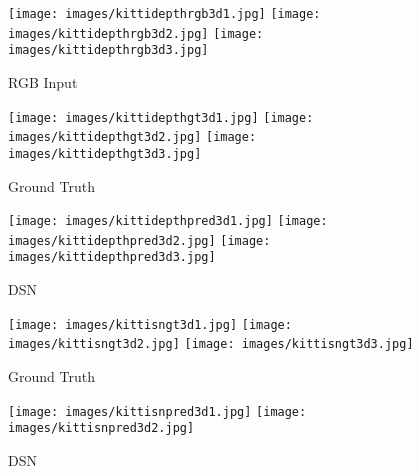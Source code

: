 \documentclass[5p]{elsarticle}
\begin{document}
\begin{figure*}[t!]
\centering
     \begin{subfigure}[t]{0.19\textwidth}
         \centering
         \caption{RGB Input}
         \texttt{[image: images/kittidepthrgb3d1.jpg]}
         \hspace{1em}
         \texttt{[image: images/kittidepthrgb3d2.jpg]}
         \hspace{1em}
         \texttt{[image: images/kittidepthrgb3d3.jpg]}
         \label{kittisubfig3d:0}
     \end{subfigure}
     \begin{subfigure}[t]{0.19\textwidth}
         \centering
         \caption{Ground Truth}
         \texttt{[image: images/kittidepthgt3d1.jpg]}
         \hspace{1em}
         \texttt{[image: images/kittidepthgt3d2.jpg]}
         \hspace{1em}
         \texttt{[image: images/kittidepthgt3d3.jpg]}
         \label{kittisubfig3d:1}
     \end{subfigure}
         \begin{subfigure}[t]{0.19\textwidth}
         \centering
         \caption{DSN}
         \texttt{[image: images/kittidepthpred3d1.jpg]}
         \hspace{1em}
         \texttt{[image: images/kittidepthpred3d2.jpg]}
         \hspace{1em}
         \texttt{[image: images/kittidepthpred3d3.jpg]}
         \label{kittisubfig3d:2}
     \end{subfigure}
     \begin{subfigure}[t]{0.19\textwidth}
         \centering
         \caption{Ground Truth}
         \texttt{[image: images/kittisngt3d1.jpg]}
         \hspace{1em}
         \texttt{[image: images/kittisngt3d2.jpg]}
         \hspace{1em}
         \texttt{[image: images/kittisngt3d3.jpg]}
         \label{kittisubfig3d:3}
     \end{subfigure}
          \begin{subfigure}[t]{0.19\textwidth}
         \centering
         \caption{DSN}
         \texttt{[image: images/kittisnpred3d1.jpg]}
         \hspace{1em}
         \texttt{[image: images/kittisnpred3d2.jpg]}

\end{subfigure}
\end{figure*}
\end{document}
